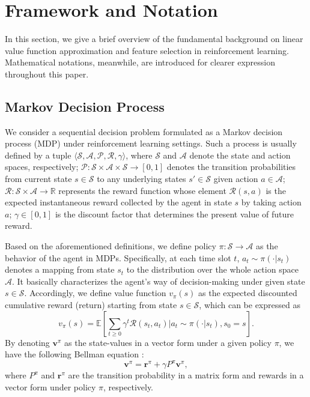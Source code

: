 \documentclass[onecolumn, conference]{IEEEtran}
\begin{document}
\section{Framework and Notation}\label{sec:framework}
In this section, we give a brief overview of the fundamental background on linear value function approximation and feature selection in reinforcement learning. Mathematical notations, meanwhile, are introduced for clearer expression throughout this paper. 
\subsection{Markov Decision Process} 
We consider a sequential decision problem formulated as a Markov decision process (MDP) under reinforcement learning settings. Such a process is usually defined by a tuple $\langle \mathcal{S},\mathcal{A},\mathcal{P}, \mathcal{R},\gamma\rangle$, where $\mathcal{S}$ and $\mathcal{A}$ denote the state and action spaces, respectively; $\mathcal{P}: \mathcal{S}\times\mathcal{A} \times \mathcal{S} \rightarrow [0,1] $ denotes the transition probabilities from current state $s\in \mathcal{S}$ to any underlying states $s'\in \mathcal{S}$ given action $a\in \mathcal{A}$; $\mathcal{R}: \mathcal{S}\times\mathcal{A}  \rightarrow \mathbb{R}$ represents the reward function whose element $\mathcal{R}(s,a)$ is the expected instantaneous reward collected by the agent in state $s$ by taking action $a$; $\gamma\in [0,1]$ is the discount factor that determines the present value of future reward.

Based on the aforementioned definitions, we define policy $\pi: \mathcal{S}\rightarrow \mathcal{A}$ as the behavior of the agent in MDPs. Specifically, at each time slot $t$, $a_t\sim \pi(\cdot|s_t)$ denotes a mapping from state $s_t$ to the distribution over the whole action space $\mathcal{A}$. It basically characterizes the agent's way of decision-making under given state $s\in \mathcal{S}$. Accordingly, we define value function $v_\pi(s)$ as the expected discounted cumulative reward (return) starting from state $s\in\mathcal{S}$, which can be expressed as
	\begin{equation}
		v_\pi (s) = \mathbb{E}\left[\sum_{t\ge 0}\gamma^{t} \mathcal{R}(s_t,a_t)\Big| a_t \sim \pi(\cdot|s_t),s_0=s \right].
	\end{equation}
By denoting $\boldsymbol{v}^{\pi}$ as the state-values in a vector form under a given policy $\pi$, we have the following Bellman equation \cite{Puterman1994MarkovDP}:
	\begin{equation}\label{Bellman Equation}
		\boldsymbol{v}^\pi = \boldsymbol{r}^\pi +\gamma P^\pi \boldsymbol{v}^\pi,
	\end{equation}
	where $P^\pi$ and $\boldsymbol{r}^\pi$ are the transition probability in a matrix form and rewards in a vector form under policy $\pi$, respectively. 
\end{document}
